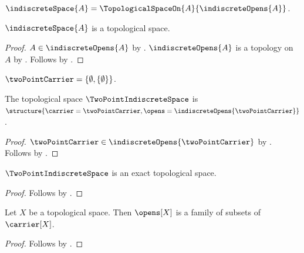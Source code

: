 \begin{definition}\label{indiscrete_space}
    $\indiscreteSpace{A}=\TopologicalSpaceOn{A}{\indiscreteOpens{A}}$.
\end{definition}

\begin{theorem}\label{indiscrete_space_is_topological_space}
    $\indiscreteSpace{A}$ is a topological space.
\end{theorem}
\begin{proof}
    $A\in\indiscreteOpens{A}$
        by .
    $\indiscreteOpens{A}$ is a topology on $A$ by
        .
    Follows by
        .
\end{proof}

\begin{definition}\label{two_point_carrier}
    $\twoPointCarrier=\{\emptyset,\{\emptyset\}\}$.
\end{definition}

\begin{instance}\label{two_point_indiscrete_space}
    The topological space $\TwoPointIndiscreteSpace$ is
        $\structure{
            \carrier=\twoPointCarrier,
            \opens=\indiscreteOpens{\twoPointCarrier}
        }$.
\end{instance}
\begin{proof}
    $\twoPointCarrier\in\indiscreteOpens{\twoPointCarrier}$
        by .
    Follows by .
\end{proof}

\begin{proposition}\label{two_point_indiscrete_space_exact}
    $\TwoPointIndiscreteSpace$ is an exact topological space.
\end{proposition}
\begin{proof}
    Follows by
        .
\end{proof}

\begin{proposition}\label{opens_type}
    Let $X$ be a topological space.
    Then $\opens[X]$ is a family of subsets of $\carrier[X]$.
\end{proposition}
\begin{proof}
    Follows by .
\end{proof}

